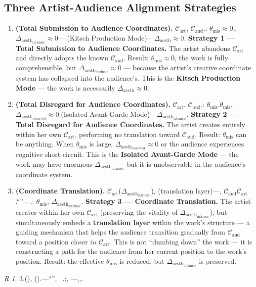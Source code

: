 \documentclass[12pt,a4paper]{article}
\theoremstyle{remark}
\newtheorem{remark}[theorem]Remark
\newcommand{\AudCoord}{\mathcal{C}_{\text{aud}}}
\newcommand{\ArtCoord}{\mathcal{C}_{\text{art}}}
\newcommand{\AesthDelta}{\Delta_{\text{aesth}}}
\begin{document}
\subsection{Three Artist-Audience Alignment Strategies}
\begin{enumerate}[label=\textbf{ \arabic*.}, leftmargin=*]
 \item \textbf{ (Total Submission to Audience Coordinates).}
 $\ArtCoord$, $\AudCoord$.: $\theta_{\text{mis}} \approx 0$,, $\AesthDelta_{\text{intrinsic}} \approx 0$---.(Kitsch Production Mode)---$\AesthDelta \approx 0$.
 \textbf{Strategy 1 --- Total Submission to Audience Coordinates.}
 The artist abandons $\ArtCoord$ and directly adopts the known $\AudCoord$. Result: $\theta_{\text{mis}} \approx 0$, the work is fully comprehensible, but $\AesthDelta_{\text{intrinsic}} \approx 0$ --- because the artist's creative coordinate system has collapsed into the audience's. This is the \textbf{Kitsch Production Mode} --- the work is necessarily $\AesthDelta \approx 0$.
 \item \textbf{ (Total Disregard for Audience Coordinates).}
 $\ArtCoord$, $\AudCoord$.: $\theta_{\text{mis}}$.$\theta_{\text{mis}}$, $\AesthDelta_{\text{observed}} \approx 0$.(Isolated Avant-Garde Mode)---$\AesthDelta_{\text{intrinsic}}$.
 \textbf{Strategy 2 --- Total Disregard for Audience Coordinates.}
 The artist creates entirely within her own $\ArtCoord$, performing no translation toward $\AudCoord$. Result: $\theta_{\text{mis}}$ can be anything. When $\theta_{\text{mis}}$ is large, $\AesthDelta_{\text{observed}} \approx 0$ or the audience experiences cognitive short-circuit. This is the \textbf{Isolated Avant-Garde Mode} --- the work may have enormous $\AesthDelta_{\text{intrinsic}}$ but it is unobservable in the audience's coordinate system.
 \item \textbf{ (Coordinate Translation).}
 $\ArtCoord$($\AesthDelta_{\text{intrinsic}}$), (translation layer)---, $\AudCoord$$\ArtCoord$.``''---.: $\theta_{\text{mis}}$, $\AesthDelta_{\text{intrinsic}}$.
 \textbf{Strategy 3 --- Coordinate Translation.}
 The artist creates within her own $\ArtCoord$ (preserving the vitality of $\AesthDelta_{\text{intrinsic}}$), but simultaneously embeds a \textbf{translation layer} within the work's structure --- a guiding mechanism that helps the audience transition gradually from $\AudCoord$ toward a position closer to $\ArtCoord$. This is not ``dumbing down'' the work --- it is constructing a path for the audience from her current position to the work's position. Result: the effective $\theta_{\text{mis}}$ is reduced, but $\AesthDelta_{\text{intrinsic}}$ is preserved.
\end{enumerate}
\begin{remark}
3.(), ().---``'', \ .:, ---,,.
\end{remark}
\end{document}
